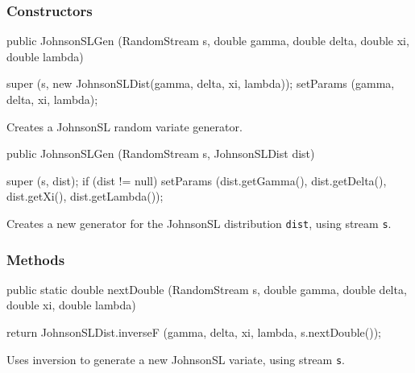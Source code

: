 \subsubsection* {Constructors}
\begin{code}

   public JohnsonSLGen (RandomStream s, double gamma, double delta,
                        double xi, double lambda) \begin{hide} {
      super (s, new JohnsonSLDist(gamma, delta, xi, lambda));
      setParams (gamma, delta, xi, lambda);
   }\end{hide}
\end{code}
\begin{tabb} Creates a JohnsonSL random variate generator.
\end{tabb}
\begin{code}

   public JohnsonSLGen (RandomStream s, JohnsonSLDist dist) \begin{hide} {
      super (s, dist);
      if (dist != null)
         setParams (dist.getGamma(), dist.getDelta(), dist.getXi(),
                    dist.getLambda());
   } \end{hide}
\end{code}
 \begin{tabb}  Creates a new generator for the JohnsonSL
   distribution \texttt{dist}, using stream \texttt{s}.
 \end{tabb}

\subsubsection* {Methods}
\begin{code}

   public static double nextDouble (RandomStream s, double gamma,
                                    double delta, double xi, double lambda) \begin{hide} {
      return JohnsonSLDist.inverseF (gamma, delta, xi, lambda,
                                        s.nextDouble());
   }\end{hide}
\end{code}
 \begin{tabb}  Uses inversion to generate a new JohnsonSL variate,
   using stream \texttt{s}.
 \end{tabb}
\begin{hide}
\begin{code}
}\end{code}
\end{hide}

